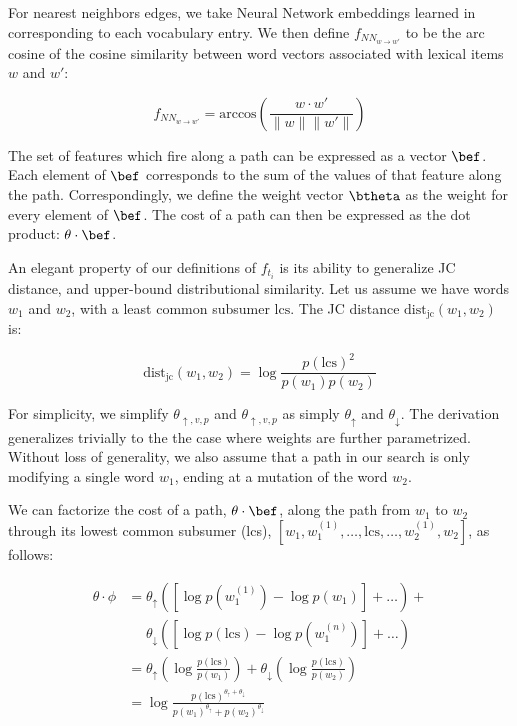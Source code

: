 For nearest neighbors edges, we take Neural Network embeddings learned
  in  corresponding to each vocabulary entry.
We then define $f_{NN_{w \rightarrow w'}}$
  to be the arc cosine of the cosine similarity between word vectors
  associated with lexical items $w$ and $w'$:

\begin{equation*}
  f_{NN_{w \rightarrow w'}}
    = \textrm{arccos} \left( \frac{w \cdot w'}{\|w\| \|w'\|} \right)
\end{equation*}

The set of features which fire along a path
  can be expressed as a vector $\bef$.
Each element of $\bef$ corresponds to the sum of the values of that
  feature along the path.
Correspondingly, we define the weight vector $\btheta$ as the
  weight for every element of $\bef$.
The cost of a path can then be expressed as the dot product:
  $\theta \cdot \bef$.

%
%
An elegant property of our definitions of $f_{t_i}$ is its ability to
  generalize JC distance, and upper-bound distributional similarity.
Let us assume we have words $w_1$ and $w_2$, with a least common subsumer $\textrm{lcs}$.
The JC distance $\textrm{dist}_{\textrm{jc}}(w_1, w_2)$ is:

\begin{equation}
\textrm{dist}_{\textrm{jc}}(w_1, w_2)
  = \log\frac{p(\textrm{lcs})^2}{p(w_1)p(w_2)}
\label{eqn:jc}
\end{equation}

For simplicity, we simplify $\theta_{\uparrow,v,p}$ and $\theta_{\uparrow,v,p}$
  as simply $\theta_\uparrow$ and $\theta_\downarrow$.
The derivation generalizes trivially to the the case where weights are
  further parametrized.
Without loss of generality, we also assume that a path in our search
  is only modifying a single word $w_1$, ending at a mutation of the
  word $w_2$.

We can factorize the cost of a path, $\theta \cdot \bef$, along the path
  from $w_1$ to $w_2$ through its lowest common subsumer (lcs),
  $[w_1, w_1^{(1)}, \dots, \textrm{lcs}, \dots,  w_2^{(1)}, w_2]$,
  as follows:

\begin{align*}
\theta \cdot \phi
  &= \theta_\uparrow \left( 
    \left[\log p(w_1^{(1)}) - \log p(w_1)\right] +
    \dots
    \right) + \\
  &~~~~~~ \theta_\downarrow \left( 
    \left[\log p(\textrm{lcs}) - \log p(w_1^{(n)}) \right] +
    \dots
    \right) \\
  &= \theta_\uparrow \left( \log \frac{p(\textrm{lcs})}{p(w_1)} \right) +
     \theta_\downarrow \left( \log \frac{p(\textrm{lcs})}{p(w_2)} \right) \\
  &= \log \frac{ p(\textrm{lcs})^{\theta_\uparrow + \theta_\downarrow} }
               { p(w_1)^{\theta_\uparrow} + p(w_2)^{\theta_\downarrow} }
\end{align*}

